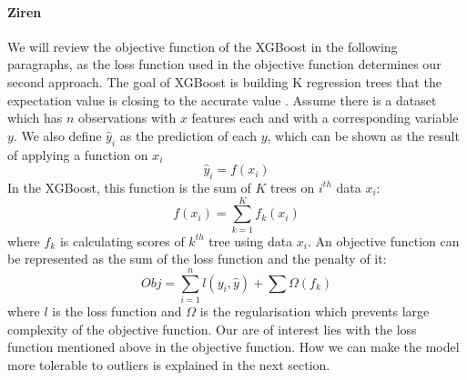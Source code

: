\documentclass[runningheads]{llncs}
\begin{document}
\paragraph{Ziren}We will review the objective function of the XGBoost in the following paragraphs, as the loss function used in the objective function determines our second approach. The goal of XGBoost is building K regression trees that the expectation value is closing to the accurate value \citep{chen2016xgboost}. Assume there is a dataset which has $n$ observations with $x$ features each and with a corresponding variable $y$. We also define $\hat{y}_i$ as the prediction of each $y$, which can be shown as the result of applying a function on $x_i$
\begin{equation}
    \hat{y}_i = f(x_i)
\end{equation}
In the XGBoost, this function is the sum of $K$ trees on $i^{th}$ data $x_i$:
\begin{equation}
    f(x_i) = \sum^K_{k=1} f_k(x_i)
\end{equation}
where $f_k$ is calculating scores of $k^{th}$ tree using data $x_i$. An objective function can be represented as the sum of the loss function and the penalty of it:
\begin{equation}
    Obj = \sum^n_{i=1}l(y_i, \hat{y}) + \sum \Omega(f_k)
\end{equation}
where $l$ is the loss function and $\Omega$ is the regularisation which prevents large complexity of the objective function. Our are of interest lies with the loss function mentioned above in the objective function. How we can make the model more tolerable to outliers is explained in the next section.
\end{document}

